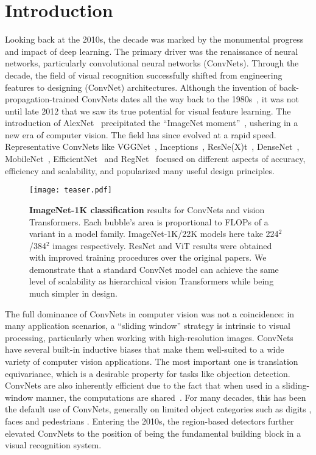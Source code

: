 \section{Introduction}
\label{sec:intro}

Looking back at the 2010s, the decade was marked by the monumental progress and impact of deep learning. The primary driver was the renaissance of neural networks, particularly convolutional neural networks (ConvNets). Through the decade, the field of visual recognition successfully shifted from engineering features to designing (ConvNet) architectures. Although the invention of back-propagation-trained ConvNets dates all the way back to the 1980s~\cite{LeCun1989}, it was not until late 2012 that we saw its true potential for visual feature learning. The introduction of AlexNet~\cite{alexnet} precipitated the ``ImageNet moment''~\cite{Russakovsky2015}, ushering in a new era of computer vision. The field has since evolved at a rapid speed. Representative ConvNets like VGGNet~\cite{Simonyan2014}, Inceptions~\cite{Szegedy2015}, ResNe(X)t~\cite{resnet,Xie2017}, DenseNet~\cite{densenet}, MobileNet~\cite{Howard2017}, EfficientNet~\cite{Tan2019efficientnet} and RegNet~\cite{Radosavovic2020designing} focused on different aspects of accuracy, efficiency and scalability, and popularized many useful design principles. 

\begin{figure}[!htbp]
\centering
\texttt{[image: teaser.pdf]}
\caption{\textbf{ImageNet-1K classification} results for \cb ConvNets and \vb vision Transformers. Each bubble's area is proportional to FLOPs of a variant in a model family. ImageNet-1K/22K models here take 224$^2$/384$^2$ images respectively. ResNet and ViT results were obtained with improved training procedures over the original papers. We demonstrate that a standard ConvNet model can achieve the same level of scalability as hierarchical vision Transformers while being much simpler in design.}
\label{fig:teaser}
\end{figure}

The full dominance of ConvNets in computer vision was not a coincidence: in many application scenarios, a ``sliding window'' strategy is intrinsic to visual processing, particularly when working with high-resolution images. ConvNets have several built-in inductive biases that make them well-suited to a wide variety of computer vision applications. The most important one is translation equivariance, which is a desirable property for tasks like objection detection. ConvNets are also inherently efficient due to the fact that when used in a sliding-window manner, the computations are shared~\cite{Sermanet2014}. For many decades, this has been the default use of ConvNets, generally on limited object categories such as digits \cite{lecun1998gradient}, faces \cite{vaillant1994original,rowley1998neural} and pedestrians \cite{sermanet2013pedestrian, dollar2010fastest}. Entering the 2010s, the region-based detectors \cite{rcnn, Girshick2015, Ren2015, He2017} further elevated ConvNets to the position of being the fundamental building block in a visual recognition system. 


